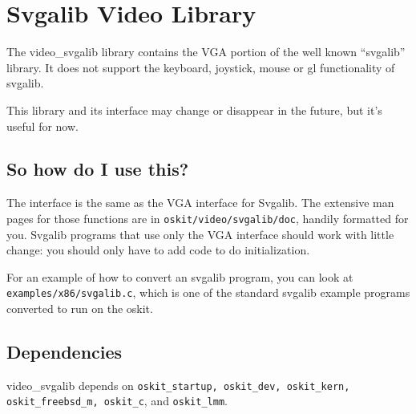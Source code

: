 %
% 
%

\section{Svgalib Video Library}
\label{svgalib}

The video_svgalib library contains the VGA portion of the well known ``svgalib''
library.  It does not support the keyboard, joystick, mouse or gl
functionality of svgalib.

This library and its interface may change or disappear in the future,
but it's useful for now.

\subsection{So how do I use this?}

The interface is the same as the VGA interface for Svgalib.  The extensive man
pages for those functions are in {\tt oskit/video/svgalib/doc}, handily
formatted for you.  Svgalib
programs that use only the VGA interface should work with little
change: you should only have to add code to do \oskit{} initialization.

For an example of how to convert an svgalib program, you can look at
{\tt examples/x86/svgalib.c}, which is one of the standard svgalib example
programs converted to run on the oskit.

\subsection{Dependencies}

video_svgalib depends on {\tt oskit_startup, oskit_dev, oskit_kern,
oskit_freebsd_m, oskit_c}, and {\tt oskit_lmm}.
